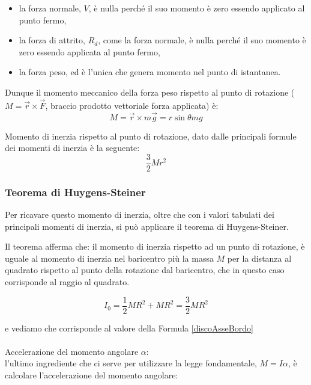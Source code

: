 \begin{itemize}
    \item la forza normale, $V$, è nulla perché il suo momento è zero essendo applicato al punto fermo,
    \item la forza di attrito, $R_d$, come la forza normale, è nulla perché il suo momento è zero essendo applicata al punto fermo,
    \item la forza peso, ed è l'unica che genera momento nel punto di istantanea.
\end{itemize}

Dunque il momento meccanico della forza peso rispetto al punto di rotazione ($M = \vec{r}\times \vec{F}$, braccio prodotto vettoriale forza applicata) è:
\begin{equation*}
   M = \vec{r} \times m\vec{g} = r\sin\theta mg
\end{equation*}

Momento di inerzia rispetto al punto di rotazione, dato dalle principali formule dei momenti di inerzia è la seguente:
\begin{equation*}
   \frac{3}{2}Mr^2
\end{equation*}

\subsubsection{Teorema di Huygens-Steiner }
Per ricavare questo momento di inerzia, oltre che con i valori tabulati dei principali momenti di inerzia, si può applicare il teorema di Huygens-Steiner.

Il teorema afferma che: il momento di inerzia rispetto ad un punto di rotazione, è uguale al momento di inerzia nel baricentro più la massa $M$ per la distanza al quadrato rispetto al punto della rotazione dal baricentro, che in questo caso corrisponde al raggio al quadrato.

\begin{equation*}
   I_0 = \frac{1}{2}MR^2 + MR^2 = \frac{3}{2}MR^2
\end{equation*}

e vediamo che corrisponde al valore della Formula \ref{discoAsseBordo}

\paragraph{}
Accelerazione del momento angolare $\alpha$:\\
l'ultimo ingrediente che ci serve per utilizzare la legge fondamentale, $M = I\alpha$, è calcolare l'accelerazione del momento angolare:

